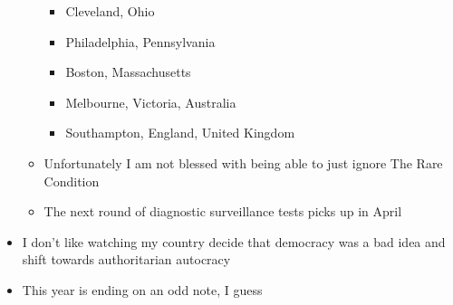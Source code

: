 \begin{itemize}
\begin{itemize}
    \begin{itemize}
    \tightlist
    \item
      Cleveland, Ohio
    \item
      Philadelphia, Pennsylvania
    \item
      Boston, Massachusetts
    \item
      Melbourne, Victoria, Australia
    \item
      Southampton, England, United Kingdom
    \end{itemize}
  \item
    Unfortunately I am not blessed with being able to just ignore The
    Rare Condition
  \item
    The next round of diagnostic surveillance tests picks up in April
  \end{itemize}
\item
  I don't like watching my country decide that democracy was a bad idea
  and shift towards authoritarian autocracy
\item
  This year is ending on an odd note, I guess
\end{itemize}
